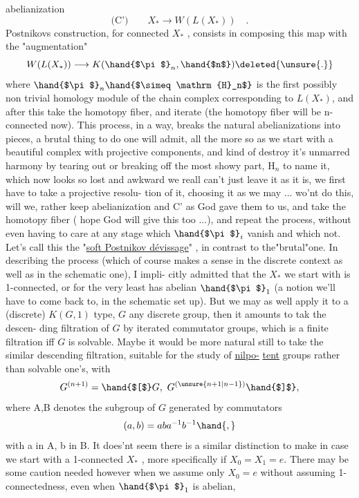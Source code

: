 
abelianization
\[ \text{(C')} \qquad X_{*} \longrightarrow W(L(X_{*})) \quad . \]
Postnikovs construction, for connected $X_{*}$ , consists in composing
this map with the "augmentation"
\[ W(L(X_{*})) \longrightarrow K(\hand{$\pi$}_n,\hand{$n$}) \deleted{\unsure{.}} \]
\hand{(}where $\hand{$\pi$}_n\hand{$\simeq \mathrm{H}_n$}$ is the first possibly non trivial homology module of the
chain complex corresponding to $L(X_{*})$\hand{)}, and after this  take the homotopy
fiber, and iterate (the homotopy fiber will be n-connected now). This
process, in a way, breaks the natural abelianizations  into
pieces, a  brutal thing to do one will admit, all the more so as
we start with a beautiful complex with projective components, and kind
of destroy it's unmarred harmony by tearing out or breaking off the most
showy part, $\mathrm{H}_n$ to name it, which now looks so lost and awkward we reall
can't just leave it as it is, we first have to take a projective resolu-%
tion of it, choosing it as we may ...   wo'nt do  this, will we, 
rather keep abelianization and \hand{(}C'\hand{)} as God gave them to us, and take the
homotopy fiber ( hope God will give this too ...), and repeat the
process, without even having to care at any stage which $\hand{$\pi$}_i$ vanish and
which not. Let's call this the "\uline{soft Postnikov dévissage}" , in contrast
to the"brutal"one. In describing the process (which of course makes a
sense in the discrete context as well as in the schematic one), I impli-%
citly admitted that the $X_{*}$ we start with is 1-connected, or for the
very least has abelian $\hand{$\pi$}_1$ (a notion we'll have to come back to, in the
schematic  set up). But we may as well apply it to a (discrete)
$K(G,1)$ type, $G$ any discrete group, then it amounts to tak the descen-%
ding filtration of $G$ by iterated commutator groups, which is a finite
filtration iff $G$ is solvable. Maybe it would be more natural still to
take the similar descending filtration, suitable for the study of \uline{nilpo-}%
\uline{tent} groups rather than solvable one's, with
\[ G^{(n+1)} = \hand{$[$}G,\ G^{(\unsure{n+1|n-1})}\hand{$]$}, \]
where \hand{$[$}A,B\hand{$]$} denotes the subgroup of $G$ generated by commutators 
\[ (a,b) = aba^{-1}b^{-1}\hand{,} \]
with a in A, b in B. It does'nt seem there is a similar distinction to
make in case we start with a  1-connected $X_{*}$ , more specifically
if $X_0=X_1= e$. There may be some  caution needed however when we assume
only $X_0= e$ without assuming 1-connectedness, even when $\hand{$\pi$}_1$ is abelian,

